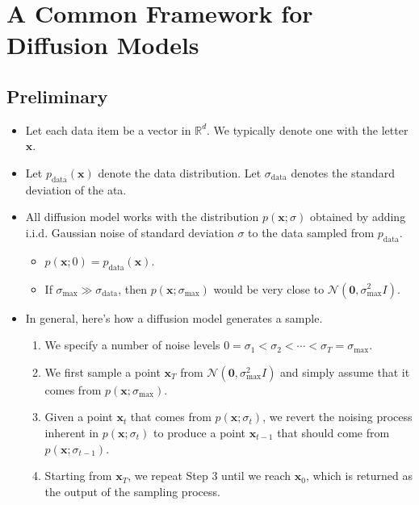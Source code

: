 \documentclass[10pt]{article}
\newcommand{\ve}[1]{\mathbf{#1}}
\newcommand{\mcal}[1]{\mathcal{#1}}
\newcommand{\Real}{\mathbb{R}}
\newcommand{\data}{\mathrm{data}}
\begin{document}
\section{A Common Framework for Diffusion Models}

\subsection{Preliminary}

\begin{itemize}
  \item Let each data item be a vector in $\Real^d$. We typically denote one with the letter $\ve{x}$.
  
  \item Let $p_{\data}(\ve{x})$ denote the data distribution. Let $\sigma_{\data}$ denotes the standard deviation of the ata.
  
  \item All diffusion model works with the distribution $p(\ve{x};\sigma)$ obtained by adding i.i.d. Gaussian noise of standard deviation $\sigma$ to the data sampled from $p_{\data}$.
  \begin{itemize}
    \item $p(\ve{x}; 0) = p_{\data}(\ve{x})$.
    \item If $\sigma_{\max} \gg \sigma_{\data}$, then $p(\ve{x};\sigma_{\max})$ would be very close to $\mcal{N}(\ve{0}, \sigma_{\max}^2 I)$.
  \end{itemize}

  \item In general, here's how a diffusion model generates a sample.
  \begin{enumerate}
    \item We specify a number of noise levels $0 = \sigma_1 < \sigma_2 < \dotsb < \sigma_T = \sigma_{\max}$.
    \item We first sample a point $\ve{x}_T$ from $\mcal{N}(\ve{0}, \sigma_{\max}^2 I)$ and simply assume that it comes from $p(\ve{x}; \sigma_{\max})$.
    \item Given a point $\ve{x}_t$ that comes from $p(\ve{x}; \sigma_t)$, we revert the noising process inherent in $p(\ve{x}; \sigma_t)$ to produce a point $\ve{x}_{t-1}$ that should come from $p(\ve{x};\sigma_{t-1})$.
    \item Starting from $\ve{x}_T$, we repeat Step 3 until we reach $\ve{x}_0$, which is returned as the output of the sampling process.
  \end{enumerate}
\end{itemize}
\end{document}
